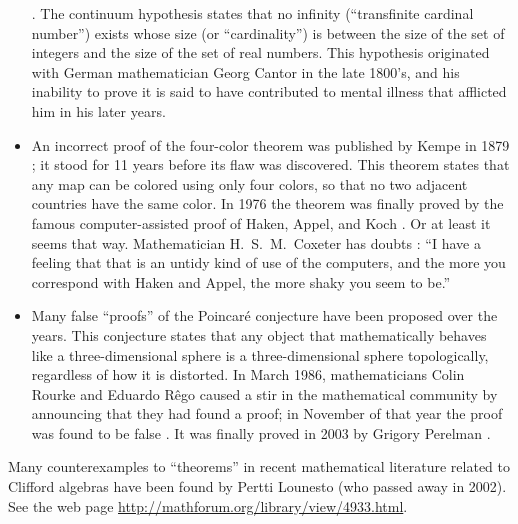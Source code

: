 \begin{itemize}
\cite[p.~166]{Enderton}.  The continuum hypothesis states that no
infinity (``transfinite cardinal number'') exists whose size (or ``cardinality'') is
between the size of the set of integers and the size of the set of real
numbers.  This hypothesis originated with German mathematician Georg
Cantor in the late 1800's, and his inability to prove it
is said to have contributed to mental illness that afflicted him in his later
years.
  \item An incorrect proof of the four-color theorem
was published by Kempe in 1879
\cite[p.~582]{Courant}; it stood for 11 years before
its flaw was discovered.  This theorem states that any map can be colored
using only four colors, so that no two adjacent countries have the same
color.  In 1976 the theorem was finally proved by the famous computer-assisted
proof of Haken, Appel, and Koch \cite{Swart}.  Or at least it seems that way.  Mathematician
H.~S.~M.~Coxeter has doubts \cite[p.~58]{Davis}:  ``I
have a feeling that that is an untidy kind of use of the computers, and the more
you correspond with Haken and Appel, the more shaky you seem to be.''
  \item Many false ``proofs'' of the Poincar\'{e}
conjecture have been proposed over the years.
This conjecture states that any object that mathematically behaves like a
three-dimensional sphere is a three-dimensional sphere topologically,
regardless of how it is distorted.  In March 1986, mathematicians Colin
Rourke and Eduardo R\^{e}go
caused  a stir in the mathematical community by announcing that they had found
a proof; in November of that year the proof was found to be false \cite[p.
218]{PetersonI}.  It was finally proved in 2003 by Grigory Perelman
\label{poincare}\cite{Szpiro}.
 \end{itemize}

Many counterexamples to ``theorems'' in recent mathematical
literature related to Clifford algebras
 have been found by Pertti
Lounesto (who passed away in 2002).
See the web page \url{http://mathforum.org/library/view/4933.html}.

